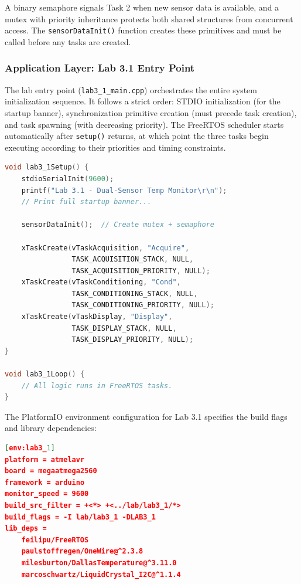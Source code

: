 A binary semaphore signals Task 2 when new sensor data is available, and a mutex with priority inheritance protects both shared structures from concurrent access. The \texttt{sensorDataInit()} function creates these primitives and must be called before any tasks are created.

\subsubsection{Application Layer: Lab 3.1 Entry Point}

The lab entry point (\texttt{lab3\_1\_main.cpp}) orchestrates the entire system initialization sequence. It follows a strict order: STDIO initialization (for the startup banner), synchronization primitive creation (must precede task creation), and task spawning (with decreasing priority). The FreeRTOS scheduler starts automatically after \texttt{setup()} returns, at which point the three tasks begin executing according to their priorities and timing constraints.

\begin{lstlisting}[language=C++, caption=Lab 3.1 entry point (lab3\_1\_main.cpp --- excerpt), label=lst:lab3_1_main]
void lab3_1Setup() {
    stdioSerialInit(9600);
    printf("Lab 3.1 - Dual-Sensor Temp Monitor\r\n");
    // Print full startup banner...

    sensorDataInit();  // Create mutex + semaphore

    xTaskCreate(vTaskAcquisition, "Acquire",
                TASK_ACQUISITION_STACK, NULL,
                TASK_ACQUISITION_PRIORITY, NULL);
    xTaskCreate(vTaskConditioning, "Cond",
                TASK_CONDITIONING_STACK, NULL,
                TASK_CONDITIONING_PRIORITY, NULL);
    xTaskCreate(vTaskDisplay, "Display",
                TASK_DISPLAY_STACK, NULL,
                TASK_DISPLAY_PRIORITY, NULL);
}

void lab3_1Loop() {
    // All logic runs in FreeRTOS tasks.
}
\end{lstlisting}

The PlatformIO environment configuration for Lab 3.1 specifies the build flags and library dependencies:

\begin{lstlisting}[language=json, caption=PlatformIO environment for Lab 3.1 (platformio.ini --- excerpt), label=lst:platformio_lab3_1]
[env:lab3_1]
platform = atmelavr
board = megaatmega2560
framework = arduino
monitor_speed = 9600
build_src_filter = +<*> +<../lab/lab3_1/*>
build_flags = -I lab/lab3_1 -DLAB3_1
lib_deps =
    feilipu/FreeRTOS
    paulstoffregen/OneWire@^2.3.8
    milesburton/DallasTemperature@^3.11.0
    marcoschwartz/LiquidCrystal_I2C@^1.1.4
\end{lstlisting}
